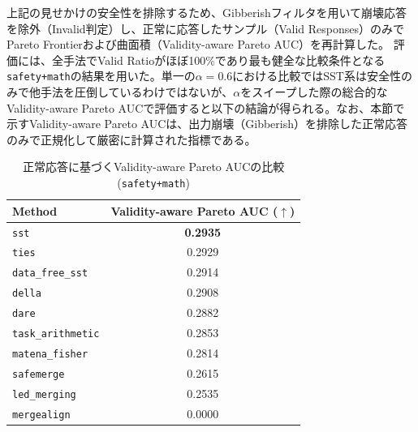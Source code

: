 \documentclass{article}
\begin{document}
上記の見せかけの安全性を排除するため、Gibberishフィルタを用いて崩壊応答を除外（Invalid判定）し、正常に応答したサンプル（Valid Responses）のみでPareto Frontierおよび曲面積（Validity-aware Pareto AUC）を再計算した。
評価には、全手法でValid Ratioがほぼ100\%であり最も健全な比較条件となる\texttt{safety+math}の結果を用いた。単一の$\alpha=0.6$における比較ではSST系は安全性のみで他手法を圧倒しているわけではないが、$\alpha$をスイープした際の総合的なValidity-aware Pareto AUCで評価すると以下の結論が得られる。なお、本節で示すValidity-aware Pareto AUCは、出力崩壊（Gibberish）を排除した正常応答のみで正規化して厳密に計算された指標である。

\begin{table}[H]
\centering
\caption{正常応答に基づくValidity-aware Pareto AUCの比較(\texttt{safety+math})}
\label{tab:pareto_auc}
\small
\begin{tabular}{lc}
\toprule
\textbf{Method} & \textbf{Validity-aware Pareto AUC ($\uparrow$)} \\
\midrule
\texttt{sst} & \textbf{0.2935} \\
\texttt{ties} & 0.2929 \\
\texttt{data\_free\_sst} & 0.2914 \\
\texttt{della} & 0.2908 \\
\texttt{dare} & 0.2882 \\
\texttt{task\_arithmetic} & 0.2853 \\
\texttt{matena\_fisher} & 0.2814 \\
\texttt{safemerge} & 0.2615 \\
\texttt{led\_merging} & 0.2535 \\
\texttt{mergealign} & 0.0000 \\
\bottomrule
\end{tabular}
\end{table}
\end{document}
